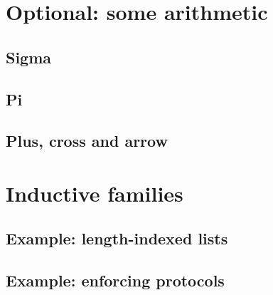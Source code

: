 \documentclass{beamer}
\begin{document}
\section{Optional: some arithmetic}

\subsection{Sigma}

\subsection{Pi}

\subsection{Plus, cross and arrow}


\section{Inductive families}

\subsection{Example: length-indexed lists}

\subsection{Example: enforcing protocols}
\end{document}
